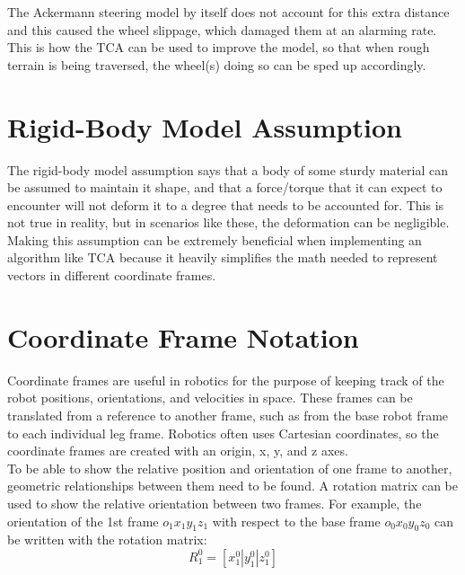 The Ackermann steering model by itself does not account for this extra distance and this caused the wheel slippage, which damaged them at an alarming rate. This is how the \ac{TCA} can be used to improve the model, so that when rough terrain is being traversed, the wheel(s) doing so can be sped up accordingly.

\section{Rigid-Body Model Assumption}
The rigid-body model assumption says that a body of some sturdy material can be assumed to maintain it shape, and that a force/torque that it can expect to encounter will not deform it to a degree that needs to be accounted for. This is not true in reality, but in scenarios like these, the deformation can be negligible. \\

Making this assumption can be extremely beneficial when implementing an algorithm like \ac{TCA} because it heavily simplifies the math needed to represent vectors in different coordinate frames.

\section{Coordinate Frame Notation}
%

Coordinate frames are useful in robotics for the purpose of keeping track of the robot positions, orientations, and velocities in space. These frames can be translated from  a reference to another frame, such as from the base robot frame to each individual leg frame. Robotics often uses Cartesian coordinates, so the coordinate frames are created with an origin, x, y, and z axes. \\

To be able to show the relative position and orientation of one frame to another, geometric relationships between them need to be found. A rotation matrix can be used to show the relative orientation between two frames. For example, the orientation of the 1st frame $o_{1}x_{1}y_{1}z_{1}$ with respect to the base frame $o_{0}x_{0}y_{0}z_{0}$ can be written with the rotation matrix:
\begin{equation}\label{traction_control:algorithms:r01}
	R^{0}_{1} = [x^{0}_{1} | y^{0}_{1} | z^{0}_{1}]
\end{equation}

